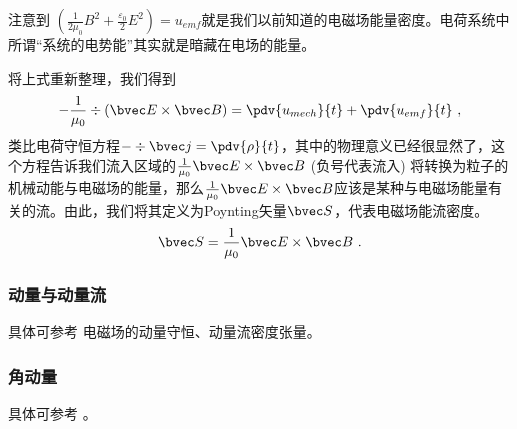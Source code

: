 注意到 $(\frac{1}{2\mu_0} B^2 + \frac{\varepsilon_0}{2} E^2) = u_{emf}$就是我们以前知道的电磁场能量密度。电荷系统中所谓“系统的电势能”其实就是暗藏在电场的能量。

将上式重新整理，我们得到
$$
- \frac{1}{\mu_0} \div(\bvec E \times \bvec B) = \pdv{u_{mech}}{t} + \pdv{u_{emf}}{t}~,
$$
类比电荷守恒方程$-\div \bvec j = \pdv{\rho}{t}$，其中的物理意义已经很显然了，这个方程告诉我们流入区域的$\frac{1}{\mu_0} \bvec E \times \bvec B$ (负号代表流入) 将转换为粒子的机械动能与电磁场的能量，那么$ \frac{1}{\mu_0} \bvec E \times \bvec B$应该是某种与电磁场能量有关的流。由此，我们将其定义为Poynting矢量$\bvec S$，代表电磁场能流密度。
$$
\bvec S = \frac{1}{\mu_0} \bvec E \times \bvec B~.
$$

\subsubsection{动量与动量流}
具体可参考 电磁场的动量守恒、动量流密度张量。

\subsubsection{角动量}
具体可参考 \cite{GriffE}。
